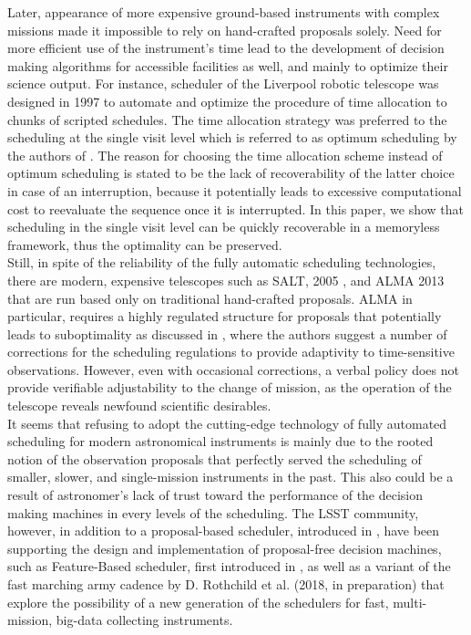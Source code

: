 \documentclass[11pt]{article}
\theoremstyle{definition}
\begin{document}
Later, appearance of more expensive ground-based instruments with complex missions made it impossible to rely on hand-crafted proposals solely. Need for more efficient use of the instrument's time lead to the development of decision making algorithms for accessible facilities as well, and mainly to optimize their science output. For instance, scheduler of the Liverpool robotic telescope was designed in 1997 to automate and optimize the procedure of time allocation to chunks of scripted schedules. The time allocation strategy was preferred to the scheduling at the single visit level which is referred to as optimum scheduling by the authors of \cite{steele1997control}. The reason for choosing the time allocation scheme instead of optimum scheduling is stated to be the lack of recoverability of the latter choice in case of an interruption, because it potentially leads to excessive computational cost to reevaluate the sequence once it is interrupted. In this paper, we show that scheduling in the single visit level can be quickly recoverable in a memoryless framework, thus the optimality can be preserved.\\
Still, in spite of the reliability of the fully automatic scheduling technologies, there are modern, expensive telescopes such as SALT, 2005 \cite{brink2008salt}, and ALMA 2013 \cite{wootten2003atacama} that are run based only on traditional hand-crafted proposals. ALMA in particular, requires a highly regulated structure for proposals that potentially leads to suboptimality as discussed in \cite{alexander2017enabling}, where the authors suggest a number of corrections for the scheduling regulations to provide adaptivity to time-sensitive observations. However, even with occasional corrections, a verbal policy does not provide verifiable adjustability to the change of mission, as the operation of the telescope reveals newfound scientific desirables.\\
It seems that refusing to adopt the cutting-edge technology of fully automated scheduling for modern astronomical instruments is mainly due to the rooted notion of the observation proposals that perfectly served the scheduling of smaller, slower, and single-mission instruments in the past. This also could be a result of astronomer's lack of trust toward the performance of the decision making machines in every levels of the scheduling. The LSST community, however, in addition to a proposal-based scheduler, introduced in \cite{delgado2016lsst}, have been supporting the design and implementation of proposal-free decision machines, such as Feature-Based scheduler, first introduced in \cite{naghib2016feature}, as well as a variant of the fast marching army cadence by D. Rothchild et al. (2018, in preparation) that explore the possibility of a new generation of the schedulers for fast, multi-mission, big-data collecting instruments.\\
\end{document}
